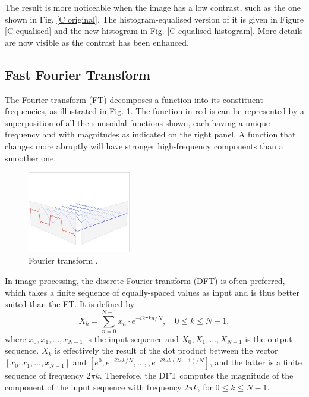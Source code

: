 \documentclass[conference]{IEEEtran}
\begin{document}
The result is more noticeable when the image has a low contrast, such as the one shown in Fig. \ref{C original}. The histogram-equalised version of it is given in Figure \ref{C equalised} and the new histogram in Fig. \ref{C equalised histogram}. More details are now visible as the contrast has been enhanced.

\subsection{Fast Fourier Transform}
The Fourier transform (FT) decomposes a function into its constituent frequencies, as illustrated in Fig. \ref{FT}. The function in red is can be represented by a superposition of all the sinusoidal functions shown, each having a unique frequency and with magnitudes as indicated on the right panel. A function that changes more abruptly will have stronger high-frequency components than a smoother one. 

\begin{figure}[htbp]
    \centering
    \includegraphics[width=0.4\textwidth]{Images/FT.jpg}
    \caption{Fourier transform \cite{Fourier transform wiki}.}
    \label{FT}
\end{figure}

In image processing, the discrete Fourier transform (DFT) is often preferred, which takes a finite sequence of equally-spaced values as input and is thus better suited than the FT. It is defined by
\begin{equation}
    X_k = \sum_{n=0}^{N-1} x_n \cdot e^{-i2\pi kn/N}, \quad 0 \leq k \leq N-1,
    \label{DFT}
\end{equation}
where $x_0,x_1,...,x_{N-1}$ is the input sequence and $X_0,X_1,...,X_{N-1}$ is the output sequence. $X_k$ is effectively the result of the dot product between the vector $[x_0,x_1,...,x_{N-1}]$ and $[e^0,e^{-i2\pi k/N},...,,e^{-i2\pi k(N-1)/N}]$, and the latter is a finite sequence of frequency $2\pi k$. Therefore, the DFT computes the magnitude of the component of the input sequence with frequency $2\pi k$, for $0 \leq k \leq N-1$.
\end{document}
